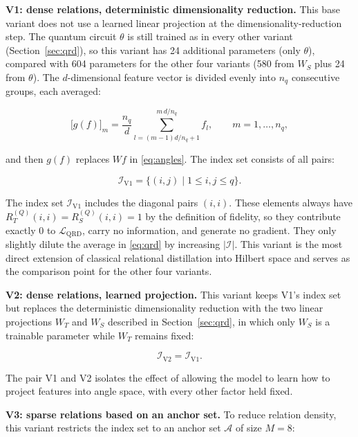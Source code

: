 \textbf{V1: dense relations, deterministic dimensionality
reduction.} This base variant does not use a learned linear
projection at the dimensionality-reduction step. The quantum circuit
$\theta$ is still trained as in every other variant
(Section~\ref{sec:qrd}), so this variant has 24 additional
parameters (only $\theta$), compared with 604 parameters for the
other four variants (580 from $W_S$ plus 24 from $\theta$). The
$d$-dimensional feature vector is divided evenly into $n_q$
consecutive groups, each averaged:

\begin{equation}
\label{eq:chunk}
\big[g(f)\big]_m = \frac{n_q}{d}
  \sum_{l = (m-1)d/n_q + 1}^{m\,d/n_q} f_l,
  \qquad m = 1,\ldots,n_q,
\end{equation}

and then $g(f)$ replaces $W f$ in \eqref{eq:angles}. The index set
consists of all pairs:

\begin{equation}
\label{eq:i-v1}
\mathcal{I}_{\mathrm{V1}} = \{(i,j) \mid 1 \le i,j \le q\}.
\end{equation}

The index set $\mathcal{I}_{\mathrm{V1}}$ includes the diagonal pairs
$(i,i)$. These elements always have
$R_T^{(Q)}(i,i) = R_S^{(Q)}(i,i) = 1$ by the definition of fidelity,
so they contribute exactly 0 to $\mathcal{L}_{\mathrm{QRD}}$, carry
no information, and generate no gradient. They only slightly dilute
the average in \eqref{eq:qrd} by increasing $|\mathcal{I}|$. This
variant is the most direct extension of classical relational
distillation into Hilbert space and serves as the comparison point
for the other four variants.

\textbf{V2: dense relations, learned projection.} This variant keeps
V1's index set but replaces the deterministic dimensionality
reduction with the two linear projections $W_T$ and $W_S$ described
in Section~\ref{sec:qrd}, in which only $W_S$ is a trainable
parameter while $W_T$ remains fixed:

\begin{equation}
\label{eq:i-v2}
\mathcal{I}_{\mathrm{V2}} = \mathcal{I}_{\mathrm{V1}}.
\end{equation}

The pair V1 and V2 isolates the effect of allowing the model to
learn how to project features into angle space, with every other
factor held fixed.

\textbf{V3: sparse relations based on an anchor set.} To reduce
relation density, this variant restricts the index set to an anchor
set $\mathcal{A}$ of size $M = 8$:

